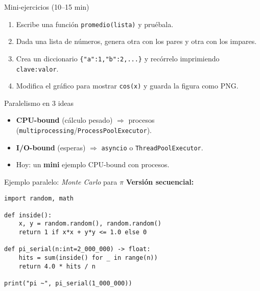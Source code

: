 \documentclass[aspectratio=169,professionalfonts]{beamer}
\begin{document}
\begin{frame}{Mini-ejercicios (10–15 min)}
\begin{enumerate}
  \item Escribe una función \texttt{promedio(lista)} y pruébala.
  \item Dada una lista de números, genera otra con los pares y otra con los impares.
  \item Crea un diccionario \texttt{\{"a":1,"b":2,...\}} y recórrelo imprimiendo \texttt{clave:valor}.
  \item Modifica el gráfico para mostrar \texttt{cos(x)} y guarda la figura como PNG.
\end{enumerate}
\end{frame}

\begin{frame}{Paralelismo en 3 ideas}
\begin{itemize}
  \item \textbf{CPU-bound} (cálculo pesado) \(\Rightarrow\) procesos (\texttt{multiprocessing}/\texttt{ProcessPoolExecutor}).
  \item \textbf{I/O-bound} (esperas) \(\Rightarrow\) \texttt{asyncio} o \texttt{ThreadPoolExecutor}.
  \item Hoy: un \textbf{mini} ejemplo CPU-bound con procesos.
\end{itemize}
\end{frame}

\begin{frame}[fragile]{Ejemplo paralelo: \textit{Monte Carlo} para \(\pi\)}
\textbf{Versión secuencial:}
\begin{verbatim}
import random, math

def inside():
    x, y = random.random(), random.random()
    return 1 if x*x + y*y <= 1.0 else 0

def pi_serial(n:int=2_000_000) -> float:
    hits = sum(inside() for _ in range(n))
    return 4.0 * hits / n

print("pi ~", pi_serial(1_000_000))
\end{verbatim}
\end{frame}
\end{document}
